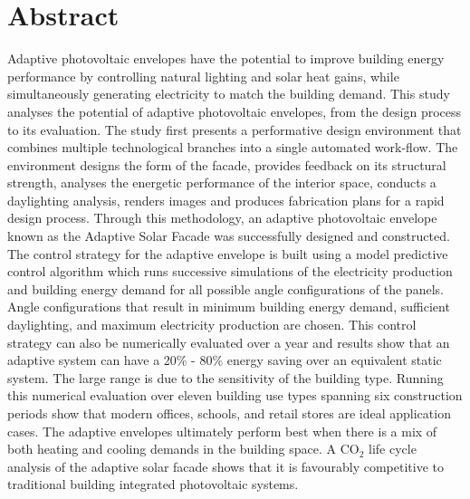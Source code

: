 \begingroup
\let\clearpage\relax
\let\cleardoublepage\relax
\let\cleardoublepage\relax

\chapter*{Abstract}

Adaptive photovoltaic envelopes have the potential to improve building energy performance by controlling natural lighting and solar heat gains, while simultaneously generating electricity to match the building demand. This study analyses the potential of adaptive photovoltaic envelopes, from the design process to its evaluation. The study first presents a performative design environment that combines multiple technological branches into a single automated work-flow. The environment designs the form of the facade, provides feedback on its structural strength, analyses the energetic performance of the interior space, conducts a daylighting analysis, renders images and produces fabrication plans for a rapid design process. Through this methodology, an adaptive photovoltaic envelope known as the Adaptive Solar Facade was successfully designed and constructed. The control strategy for the adaptive envelope is built using a model predictive control algorithm which runs successive simulations of the electricity production and building energy demand for all possible angle configurations of the panels. Angle configurations that result in minimum building energy demand, sufficient daylighting, and maximum electricity production are chosen. This control strategy can also be numerically evaluated over a year and results show that an adaptive system can have a 20\% - 80\% energy saving over an equivalent static system. The large range is due to the sensitivity of the building type. Running this numerical evaluation over eleven building use types spanning six construction periods show that modern offices, schools, and retail stores are ideal application cases. The adaptive envelopes ultimately perform best when there is a mix of both heating and cooling demands in the building space. A CO$_2$ life cycle analysis of the adaptive solar facade shows that it is favourably competitive to traditional building integrated photovoltaic systems.

\endgroup

\cleardoublepage%


